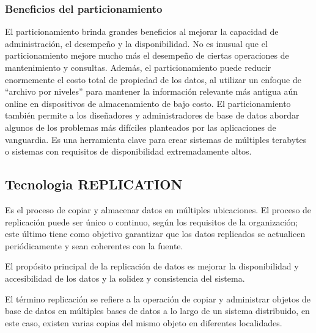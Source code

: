 \documentclass[twoside,twocolumn]{article}
\begin{document}
\subsubsection{Beneficios del particionamiento}
El particionamiento brinda grandes beneficios al mejorar la capacidad de 
administración, el desempeño y la disponibilidad. No es inusual que el
 particionamiento mejore mucho más el desempeño de ciertas operaciones de
  mantenimiento y consultas. Además, el particionamiento puede reducir 
  enormemente el costo total de propiedad de los datos, al utilizar un
   enfoque de “archivo por niveles” para mantener la información relevante
    más antigua aún online en dispositivos de almacenamiento de bajo costo.
     El particionamiento también permite a los diseñadores y administradores
      de base de datos abordar algunos de los problemas más difíciles planteados
       por las aplicaciones de vanguardia. Es una herramienta clave para crear 
       sistemas de múltiples terabytes o sistemas con requisitos de disponibilidad
        extremadamente altos. 
\subsection{Tecnologia REPLICATION}
Es el proceso de copiar y almacenar datos en múltiples ubicaciones. 
El proceso de replicación puede ser único o continuo, según los requisitos 
de la organización; este último tiene como objetivo garantizar que los datos
 replicados se actualicen periódicamente y sean coherentes con la fuente. 

El propósito principal de la replicación de datos es mejorar la 
disponibilidad y accesibilidad de los datos y la solidez y consistencia 
del sistema. 

El término replicación se refiere a la operación de copiar 
y administrar  objetos de base de datos en múltiples bases de 
datos a  lo largo de un sistema distribuido, en este caso, existen 
varias copias del mismo objeto en diferentes  localidades.  
\end{document}
